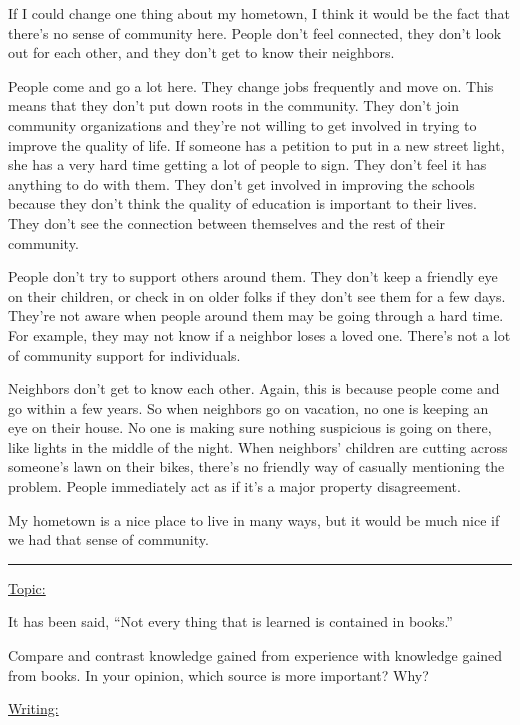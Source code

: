 \documentclass[UTF8]{ctexart}
\begin{document}
\normalsize{If I could change one thing about my hometown, I think it would be the fact that there’s no sense of community here. People don’t feel connected, they don’t look out for each other, and they don’t get to know their neighbors.

People come and go a lot here. They change jobs frequently and move on. This means that they don’t put down roots in the community. They don’t join community organizations and they’re not willing to get involved in trying to improve the quality of life. If someone has a petition to put in a new street light, she has a very hard time getting a lot of people to sign. They don’t feel it has anything to do with them. They don’t get involved in improving the schools because they don’t think the quality of education is important to their lives. They don’t see the connection between themselves and the rest of their community.

People don’t try to support others around them. They don’t keep a friendly eye on their children, or check in on older folks if they don’t see them for a few days. They’re not aware when people around them may be going through a hard time. For example, they may not know if a neighbor loses a loved one. There’s not a lot of community support for individuals.

Neighbors don’t get to know each other. Again, this is because people come and go within a few years. So when neighbors go on vacation, no one is keeping an eye on their house. No one is making sure nothing suspicious is going on there, like lights in the middle of the night. When neighbors’ children are cutting across someone’s lawn on their bikes, there’s no friendly way of casually mentioning the problem. People immediately act as if it’s a major property disagreement.

My hometown is a nice place to live in many ways, but it would be much nice if we had that sense of community.}

\noindent\rule[0.5ex]{\linewidth}{0.25pt}
\LARGE{\underline{Topic:}}

\normalsize{It has been said, “Not every thing that is learned is contained in books.”

Compare and contrast knowledge gained from experience with knowledge gained from books. In your opinion, which source is more important? Why?}

\noindent
\LARGE{\underline{Writing:}}
\end{document}
